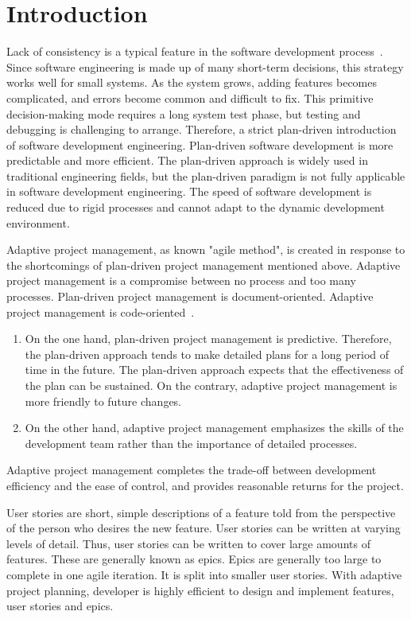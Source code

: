 \documentclass{sigchi}
\begin{document}
\section{Introduction}
Lack of consistency is a typical feature in the software development process~\cite{jr_mythical_1995}. Since software engineering is made up of many short-term decisions, this strategy works well for small systems. As the system grows, adding features becomes complicated, and errors become common and difficult to fix. This primitive decision-making mode requires a long system test phase, but testing and debugging is challenging to arrange. Therefore, a strict plan-driven introduction of software development engineering. Plan-driven software development is more predictable and more efficient. The plan-driven approach is widely used in traditional engineering fields, but the plan-driven paradigm is not fully applicable in software development engineering. The speed of software development is reduced due to rigid processes and cannot adapt to the dynamic development environment. 

Adaptive project management, as known "agile method", is created in response to the shortcomings of plan-driven project management mentioned above. Adaptive project management is a compromise between no process and too many processes. Plan-driven project management is document-oriented. Adaptive project management is code-oriented~\cite{fowler_new_2001,worsley_lost_2019}.

\begin{enumerate}
\item On the one hand, plan-driven project management is predictive. Therefore, the plan-driven approach tends to make detailed plans for a long period of time in the future. The plan-driven approach expects that the effectiveness of the plan can be sustained. On the contrary, adaptive project management is more friendly to future changes.
\item On the other hand, adaptive project management emphasizes the skills of the development team rather than the importance of detailed processes.
\end{enumerate}

Adaptive project management completes the trade-off between development efficiency and the ease of control, and provides reasonable returns for the project.

User stories are short, simple descriptions of a feature told from the perspective of the person who desires the new feature. User stories can be written at varying levels of detail. Thus, user stories can be written to cover large amounts of features. These are generally known as epics. Epics are generally too large to complete in one agile iteration. It is split into smaller user stories. With adaptive project planning, developer is highly efficient to design and implement features, user stories and epics.
\end{document}
